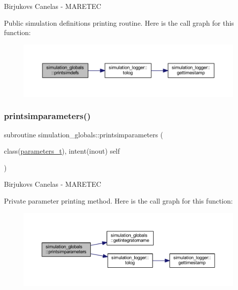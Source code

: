 Birjukovs Canelas -\/ M\+A\+R\+E\+T\+EC 

Public simulation definitions printing routine. Here is the call graph for this function\+:\nopagebreak
\begin{figure}[H]
\begin{center}
\leavevmode
\includegraphics[width=350pt]{namespacesimulation__globals_ad90d6959da1d43e2cd1febff82187ed5_cgraph}
\end{center}
\end{figure}
\mbox{\label{namespacesimulation__globals_a0b17b2f2e9e7dbbad7c9d735217c1ee1}} 
\subsubsection{\texorpdfstring{printsimparameters()}{printsimparameters()}}
{\footnotesize\ttfamily subroutine simulation\+\_\+globals\+::printsimparameters (\begin{DoxyParamCaption}\item[{class(\hyperlink{structsimulation__globals_1_1parameters__t}{parameters\+\_\+t}), intent(inout)}]{self }\end{DoxyParamCaption})\hspace{0.3cm}{\ttfamily [private]}}



Birjukovs Canelas -\/ M\+A\+R\+E\+T\+EC 

Private parameter printing method. Here is the call graph for this function\+:\nopagebreak
\begin{figure}[H]
\begin{center}
\leavevmode
\includegraphics[width=350pt]{namespacesimulation__globals_a0b17b2f2e9e7dbbad7c9d735217c1ee1_cgraph}
\end{center}
\end{figure}
\mbox{\label{namespacesimulation__globals_a1fc4653684d73efecdbd140b6cafe541}} 
